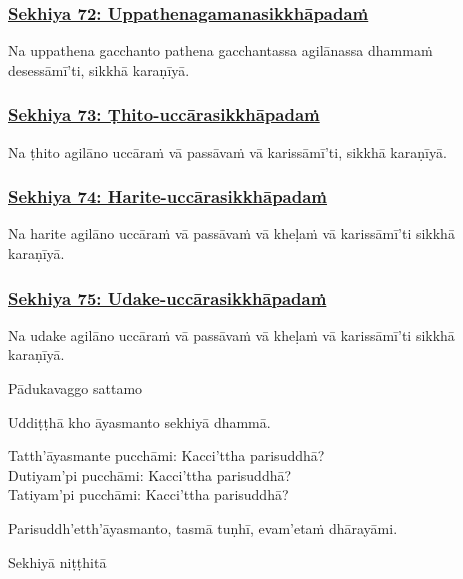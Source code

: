 \subsubsection*{\hyperref[training72]{Sekhiya 72: Uppathenagamanasikkhāpadaṁ}}
\label{sekh72}

Na uppathena gacchanto pathena gacchantassa agilānassa dhammaṁ desessāmī'ti, sikkhā karaṇīyā.



\subsubsection*{\hyperref[training73]{Sekhiya 73: Ṭhito-uccārasikkhāpadaṁ}}
\label{sekh73}

Na ṭhito agilāno uccāraṁ vā passāvaṁ vā karissāmī'ti, sikkhā karaṇīyā.



\subsubsection*{\hyperref[training74]{Sekhiya 74: Harite-uccārasikkhāpadaṁ}}
\label{sekh74}

Na harite agilāno uccāraṁ vā passāvaṁ vā kheḷaṁ vā karissāmī'ti sikkhā karaṇīyā.



\subsubsection*{\hyperref[training75]{Sekhiya 75: Udake-uccārasikkhāpadaṁ}}
\label{sekh75}

Na udake agilāno uccāraṁ vā passāvaṁ vā kheḷaṁ vā karissāmī'ti sikkhā karaṇīyā.

\begin{center}
	Pādukavaggo sattamo
\end{center}



\medskip

\begin{center}
	Uddiṭṭhā kho āyasmanto sekhiyā dhammā.

	\smallskip

	Tatth'āyasmante pucchāmi: Kacci'ttha parisuddhā?\\
	Dutiyam'pi pucchāmi: Kacci'ttha parisuddhā?\\
	Tatiyam'pi pucchāmi: Kacci'ttha parisuddhā?

	\smallskip

	Parisuddh'etth'āyasmanto, tasmā tuṇhī, evam'etaṁ dhārayāmi.
\end{center}

\begin{outro}
	Sekhiyā niṭṭhitā
\end{outro}

\clearpage

